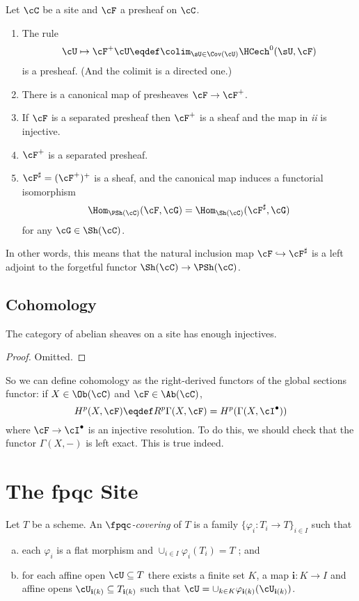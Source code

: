 \begin{thm}
Let $\cC$ be a site and $\cF$ a presheaf on $\cC$.
\begin{enumerate}[\it i.]
\item The rule
$$
\cU \mapsto \cF^+ \cU \eqdef \colim_{\sU \in \Cov(\cU)} \HCech^0(\sU, \cF)
$$
is a presheaf. (And the colimit is a directed one.)
\item There is a canonical map of presheaves $\cF \to \cF^+$.
\item If $\cF$ is a separated presheaf then $\cF^+$ is a sheaf and the map in {\it ii} is injective.
\item $\cF^+$ is a separated presheaf.
\item $\cF^\sharp = (\cF^+)^+$ is a sheaf, and the canonical map induces a functorial isomorphism
$$ 
\Hom_{\PSh(\cC)}(\cF, \cG) = \Hom_{\Sh(\cC)}(\cF^\sharp,\cG)
$$ 
for any $\cG \in \Sh(\cC)$.
\end{enumerate}
\end{thm}

In other words, this means that the natural inclusion map $\cF \hookrightarrow \cF^\sharp$ is a left adjoint to the forgetful functor $\Sh(\cC) \to \PSh(\cC)$.

\subsection{Cohomology}

\begin{thm}
The category of abelian sheaves on a site has enough injectives.
\end{thm}

\begin{proof}
Omitted.
\end{proof}

So we can define cohomology as the right-derived functors of the global sections functor: if $X \in \Ob(\cC)$ and $\cF \in \Ab(\cC)$, 
$$
H^p(X,\cF) \eqdef R^p \Gamma (X, \cF) = H^p (\Gamma(X, \cI^\bullet))
$$
where $\cF \to \cI^\bullet$ is an injective resolution. To do this, we should check that the functor $\Gamma (X, -)$ is left exact. This is true indeed. \section{The fpqc Site} %

\begin{defi}
Let $T$ be a scheme. An \emph{$\fpqc$-covering} of $T$ is a family $\{ \varphi_i : T_i \to T\}_{i \in I}$ such that
\begin{enumerate}[(a)]
\item 
each $\varphi_i$ is a flat morphism and $\cup_{i\in I} \varphi_i (T_i) = T$ ; and
\item
for each affine open $\cU \subseteq T$  there exists a finite set $K$, a map $\mathbf{i} : K \to I$ and affine opens $\cU_{\mathbf{i}(k)} \subseteq T_{\mathbf{i}(k)}$ such that $\cU = \cup_{k \in K} \varphi_{\mathbf{i}(k)}(\cU_{\mathbf{i}(k)})$.
\end{enumerate}
\end{defi}

